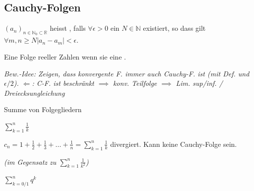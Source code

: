 \subsection{Cauchy-Folgen}
$(a_n)_{n \in \mathbb{N}_0 \subset \mathbb{R}}$ heisst , falls $\forall \epsilon >0$ ein $N \in \mathbb{N}$ existiert, so dass gilt $\forall m, n \geq N |a_n - a_m| < \epsilon$.


Eine Folge reeller Zahlen  wenn sie eine .

\textit{Bew.-Idee: Zeigen, dass konvergente F. immer auch Cauchy-F. ist (mit Def. und $\epsilon / 2$). $\Leftarrow$: C-F. ist beschränkt $\implies$ konv. Teilfolge $\implies$ Lim. sup/inf. / Dreiecksungleichung}

 Summe von Folgegliedern


 $\sum_{k=1}^n \frac{1}{k}$

$c_n=1 + \frac{1}{2} + \frac{1}{3} + ... + \frac{1}{n} = \sum_{k=1}^n \frac{1}{k}$ divergiert. Kann keine Cauchy-Folge sein.

\textit{(im Gegensatz zu $\sum_{k=1}^{n} \frac{1}{k^2}$)}

 $\sum_{k=0/1}^n q^k$

